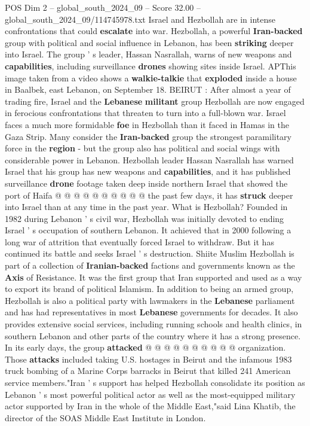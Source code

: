 \begin{textsample}{POS Dim 2 – global\_south\_2024\_09 – Score 32.00 – global\_south\_2024\_09/114745978.txt}  \label{ex:f2_pos_036}
Israel and Hezbollah are in intense confrontations that could \textbf{escalate} into war.
Hezbollah, a powerful \textbf{Iran-backed} group with political and social influence in Lebanon, has been \textbf{striking} deeper into Israel.
The group ' s leader, Hassan Nasrallah, warns of new weapons and \textbf{capabilities}, including surveillance \textbf{drones} showing sites inside Israel.
APThis image taken from a video shows a \textbf{walkie-talkie} that \textbf{exploded} inside a house in Baalbek, east Lebanon, on September 18.
BEIRUT : After almost a year of trading fire, Israel and the \textbf{Lebanese} \textbf{militant} group Hezbollah are now engaged in ferocious confrontations that threaten to turn into a full-blown war.
Israel faces a much more formidable \textbf{foe} in Hezbollah than it faced in Hamas in the Gaza Strip.
Many consider the \textbf{Iran-backed} group the strongest paramilitary force in the \textbf{region} - but the group also has political and social wings with considerable power in Lebanon.
Hezbollah leader Hassan Nasrallah has warned Israel that his group has new weapons and \textbf{capabilities}, and it has published surveillance \textbf{drone} footage taken deep inside northern Israel that showed the port of Haifa @ @ @ @ @ @ @ @ @ @ the past few days, it has \textbf{struck} deeper into Israel than at any time in the past year.
What is Hezbollah?
Founded in 1982 during Lebanon ' s civil war, Hezbollah was initially devoted to ending Israel ' s occupation of southern Lebanon.
It achieved that in 2000 following a long war of attrition that eventually forced Israel to withdraw.
But it has continued its battle and seeks Israel ' s destruction.
Shiite Muslim Hezbollah is part of a collection of \textbf{Iranian-backed} factions and governments known as the \textbf{Axis} of Resistance.
It was the first group that Iran supported and used as a way to export its brand of political Islamism.
In addition to being an armed group, Hezbollah is also a political party with lawmakers in the \textbf{Lebanese} parliament and has had representatives in most \textbf{Lebanese} governments for decades.
It also provides extensive social services, including running schools and health clinics, in southern Lebanon and other parts of the country where it has a strong presence.
In its early days, the group \textbf{attacked} @ @ @ @ @ @ @ @ @ @ organization.
Those \textbf{attacks} included taking U.S. hostages in Beirut and the infamous 1983 truck bombing of a Marine Corps barracks in Beirut that killed 241 American service members."Iran ' s support has helped Hezbollah consolidate its position as Lebanon ' s most powerful political actor as well as the most-equipped military actor supported by Iran in the whole of the Middle East,"said Lina Khatib, the director of the SOAS Middle East Institute in London.

\end{textsample}
